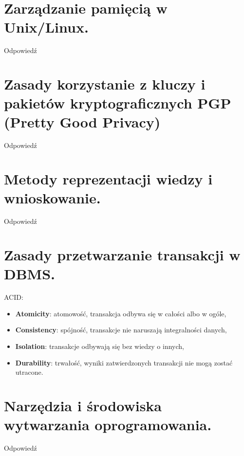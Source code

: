 \documentclass[12pt,a4paper]{article}
\begin{document}
	\section{Zarządzanie pamięcią w Unix/Linux.}
	Odpowiedź

	\section{Zasady korzystanie z kluczy i pakietów kryptograficznych PGP (Pretty Good Privacy)}
	Odpowiedź

	\section{Metody reprezentacji wiedzy i wnioskowanie.}
	Odpowiedź

	\section{Zasady przetwarzanie transakcji w DBMS.}
	ACID:
	\begin{itemize}
		\item \textbf{Atomicity}: atomowość, transakcja odbywa się w całości albo w ogóle,
		\item \textbf{Consistency}: spójność, transakcje nie naruszają integralności danych,
		\item \textbf{Isolation}: transakcje odbywają się bez wiedzy o innych,
		\item \textbf{Durability}: trwałość, wyniki zatwierdzonych transakcji nie mogą zostać utracone.
	\end{itemize}

	\section{Narzędzia i środowiska wytwarzania oprogramowania.}
	Odpowiedź
\end{document}

